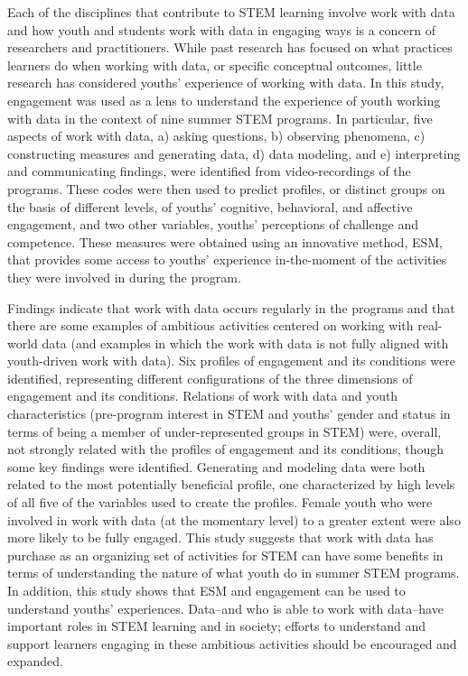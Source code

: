 \documentclass[]{msu-thesis}
\theoremstyle{definition}
\theoremstyle{definition}
\theoremstyle{definition}
\theoremstyle{remark}
\begin{document}
Each of the disciplines that contribute to STEM learning involve work
with data and how youth and students work with data in engaging ways is
a concern of researchers and practitioners. While past research has
focused on what practices learners do when working with data, or
specific conceptual outcomes, little research has considered youths'
experience of working with data. In this study, engagement was used as a
lens to understand the experience of youth working with data in the
context of nine summer STEM programs. In particular, five aspects of
work with data, a) asking questions, b) observing phenomena, c)
constructing measures and generating data, d) data modeling, and e)
interpreting and communicating findings, were identified from
video-recordings of the programs. These codes were then used to predict
profiles, or distinct groups on the basis of different levels, of
youths' cognitive, behavioral, and affective engagement, and two other
variables, youths' perceptions of challenge and competence. These
measures were obtained using an innovative method, ESM, that provides
some access to youths' experience in-the-moment of the activities they
were involved in during the program.

Findings indicate that work with data occurs regularly in the programs
and that there are some examples of ambitious activities centered on
working with real-world data (and examples in which the work with data
is not fully aligned with youth-driven work with data). Six profiles of
engagement and its conditions were identified, representing different
configurations of the three dimensions of engagement and its conditions.
Relations of work with data and youth characteristics (pre-program
interest in STEM and youths' gender and status in terms of being a
member of under-represented groups in STEM) were, overall, not strongly
related with the profiles of engagement and its conditions, though some
key findings were identified. Generating and modeling data were both
related to the most potentially beneficial profile, one characterized by
high levels of all five of the variables used to create the profiles.
Female youth who were involved in work with data (at the momentary
level) to a greater extent were also more likely to be fully engaged.
This study suggests that work with data has purchase as an organizing
set of activities for STEM can have some benefits in terms of
understanding the nature of what youth do in summer STEM programs. In
addition, this study shows that ESM and engagement can be used to
understand youths' experiences. Data--and who is able to work with
data--have important roles in STEM learning and in society; efforts to
understand and support learners engaging in these ambitious activities
should be encouraged and expanded.
\end{document}
